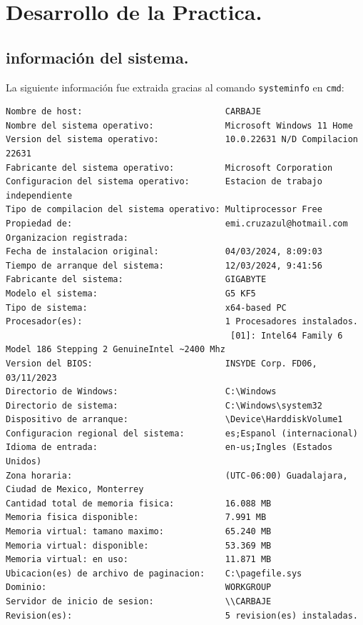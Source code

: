 \documentclass{article}
\begin{document}
\section[Desarrollo]{Desarrollo de la Practica.}
    \subsection[Especificaciones]{información del sistema.}
    La siguiente información fue extraida gracias al comando \texttt{systeminfo} en \texttt{cmd}: %
        \begin{lstlisting}[language={},basicstyle=\ttfamily\footnotesize]
Nombre de host:                            CARBAJE
Nombre del sistema operativo:              Microsoft Windows 11 Home
Version del sistema operativo:             10.0.22631 N/D Compilacion 22631
Fabricante del sistema operativo:          Microsoft Corporation
Configuracion del sistema operativo:       Estacion de trabajo independiente
Tipo de compilacion del sistema operativo: Multiprocessor Free
Propiedad de:                              emi.cruzazul@hotmail.com
Organizacion registrada:
Fecha de instalacion original:             04/03/2024, 8:09:03
Tiempo de arranque del sistema:            12/03/2024, 9:41:56
Fabricante del sistema:                    GIGABYTE
Modelo el sistema:                         G5 KF5
Tipo de sistema:                           x64-based PC
Procesador(es):                            1 Procesadores instalados.
                                            [01]: Intel64 Family 6 Model 186 Stepping 2 GenuineIntel ~2400 Mhz
Version del BIOS:                          INSYDE Corp. FD06, 03/11/2023
Directorio de Windows:                     C:\Windows
Directorio de sistema:                     C:\Windows\system32
Dispositivo de arranque:                   \Device\HarddiskVolume1
Configuracion regional del sistema:        es;Espanol (internacional)
Idioma de entrada:                         en-us;Ingles (Estados Unidos)
Zona horaria:                              (UTC-06:00) Guadalajara, Ciudad de Mexico, Monterrey
Cantidad total de memoria fisica:          16.088 MB
Memoria fisica disponible:                 7.991 MB
Memoria virtual: tamano maximo:            65.240 MB
Memoria virtual: disponible:               53.369 MB
Memoria virtual: en uso:                   11.871 MB
Ubicacion(es) de archivo de paginacion:    C:\pagefile.sys
Dominio:                                   WORKGROUP
Servidor de inicio de sesion:              \\CARBAJE
Revision(es):                              5 revision(es) instaladas.

\end{lstlisting}
\end{document}
